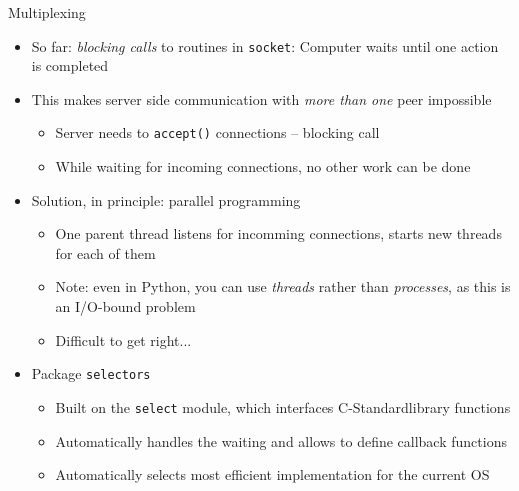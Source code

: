 \begin{frame}{Multiplexing}
%
\begin{itemize}
\item So far: \emph{blocking calls} to routines in \texttt{socket}: Computer waits until one action is completed
\item This makes server side communication with \emph{more than one} peer impossible
	\begin{itemize}
	\item Server needs to \texttt{accept()} connections -- blocking call
	\item While waiting for incoming connections, no other work can be done
	\end{itemize}
\pause
\item Solution, in principle: parallel programming
	\begin{itemize}
	\item One parent thread listens for incomming connections, starts new threads for each of them
	\item Note: even in Python, you can use \emph{threads} rather than \emph{processes}, as this is an I/O-bound problem
	\item Difficult to get right...
	\end{itemize}
\pause
\item Package \texttt{selectors}
	\begin{itemize}
	\item Built on the \texttt{select} module, which interfaces C-Standardlibrary functions
	\item Automatically handles the waiting and allows to define callback functions
	\item Automatically selects most efficient implementation for the current OS
	\end{itemize}
\end{itemize}
%
\end{frame}


